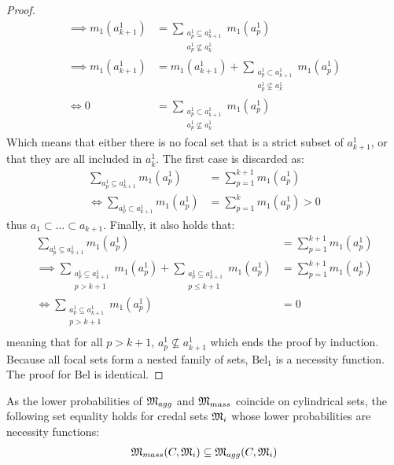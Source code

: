 \begin{proof}
\begin{align*}
        \implies m_1(a^1_{k+1}) &= \sum_{\substack{a^1_p\subseteq a^1_{k+1} \\ a^1_p\not\subseteq a^1_k}} m_1(a^1_p)\\
        \implies m_1(a^1_{k+1}) &= m_1(a^1_{k+1}) + \sum_{\substack{a^1_p\subset a^1_{k+1} \\ a^1_p\not\subseteq a^1_k}} m_1(a^1_p)\\
        \Leftrightarrow 0 &= \sum_{\substack{a^1_p\subset a^1_{k+1} \\ a^1_p\not\subseteq a^1_k}} m_1(a^1_p)
    \end{align*}
    Which means that either there is no focal set that is a strict subset of $a^1_{k+1}$, or that they are all included in $a^1_{k}$. The first case is discarded as:
    \begin{align*}
        \sum_{a^1_p\subseteq a^1_{k+1}}m_1(a^1_p) &= \sum_{p=1}^{k+1}m_1(a^1_p)\\
        \Leftrightarrow \sum_{a^1_p\subset a^1_{k+1}}m_1(a^1_p) &= \sum_{p=1}^{k}m_1(a^1_p)>0
    \end{align*}
    thus $a_1\subset\dots\subset a_{k+1}$.
    Finally, it also holds that:
    \begin{align*}
        \sum_{a^1_p\subseteq a^1_{k+1}}m_1(a^1_p) &= \sum_{p=1}^{k+1}m_1(a^1_p)\\
        \implies \sum_{\substack{a^1_p\subseteq a^1_{k+1} \\ p>k+1}} m_1(a^1_p) + \sum_{\substack{a^1_p\subseteq a^1_{k+1} \\ p\leqslant k+1}} m_1(a^1_p) &= \sum_{p=1}^{k+1}m_1(a^1_p)\\
        \Leftrightarrow \sum_{\substack{a^1_p\subseteq a^1_{k+1} \\ p>k+1}} m_1(a^1_p) &= 0\\
    \end{align*}
    meaning that for all $p>k+1$, $a^1_p\not\subseteq a^1_{k+1}$ which ends the proof by induction. Because all focal sets form a nested family of sets, $\mathrm{Bel}_1$ is a necessity function. The proof for $\mathrm{Bel}$ is identical. 
\end{proof}

As the lower probabilities of ${\mathfrak{M}}_{agg}$ and ${\mathfrak{M}}_{mass}$ coincide on cylindrical sets, the following set equality holds for credal sets ${\mathfrak{M}}_i$ whose lower probabilities are necessity functions:
\begin{eqnarray}\label{eq:inclusion_necessity}
    {\mathfrak{M}}_{mass}(C, {\mathfrak{M}}_i) \subseteq {\mathfrak{M}}_{agg}(C, {\mathfrak{M}}_i)
\end{eqnarray}

